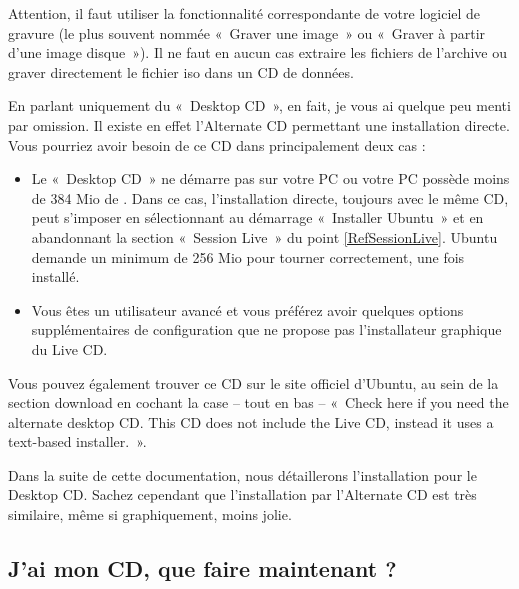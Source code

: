 \begin{nota}
Attention, il faut utiliser la fonctionnalité correspondante de votre logiciel de gravure (le plus souvent nommée «~Graver une image~» ou «~Graver à partir d'une image disque~»). Il ne faut en aucun cas extraire les fichiers de l'archive ou graver directement le fichier iso dans un CD de données.
\end{nota}
\begin{nota}
En parlant uniquement du «~Desktop CD~», en fait, je vous ai quelque peu menti par omission. Il existe en effet l'Alternate CD permettant une installation directe. Vous pourriez avoir besoin de ce CD dans principalement deux cas :\par
\begin{itemize}
\item Le «~Desktop CD~» ne démarre pas sur votre PC ou votre PC possède moins de 384 Mio de . Dans ce cas, l'installation directe, toujours avec le même CD, peut s'imposer en sélectionnant au démarrage «~Installer Ubuntu~» et en abandonnant la section «~Session Live~» du point \ref{RefSessionLive}. Ubuntu demande un minimum de 256 Mio pour tourner correctement, une fois installé.
\item Vous êtes un utilisateur avancé et vous préférez avoir quelques options supplémentaires de configuration que ne propose pas l'installateur graphique du Live CD.
\end{itemize}
\end{nota}
Vous pouvez également trouver ce CD sur le site officiel d'Ubuntu, au sein de la section download en cochant la case -- tout en bas -- «~Check here if you need the alternate desktop CD. This CD does not include the Live CD, instead it uses a text-based installer.~».\par
Dans la suite de cette documentation, nous détaillerons l'installation pour le Desktop CD. Sachez cependant que l'installation par l'Alternate CD est très similaire, même si graphiquement, moins jolie.
\subsection{J'ai mon CD, que faire maintenant ?}
